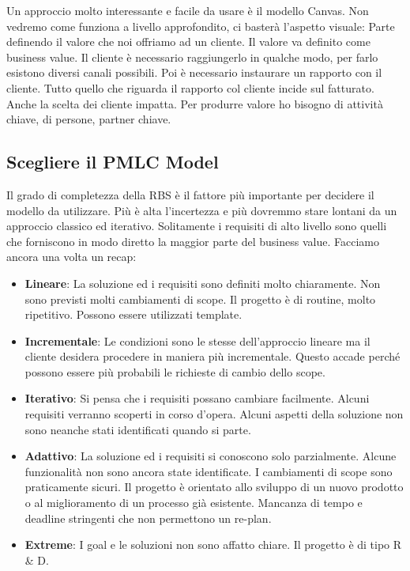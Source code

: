 \noindent Un approccio molto interessante e facile da usare è il modello Canvas. Non vedremo come funziona a livello approfondito, ci basterà l'aspetto visuale:
\noindent Parte definendo il valore che noi offriamo ad un cliente. Il valore va definito come business value. Il cliente è necessario raggiungerlo in qualche modo, per farlo esistono diversi canali possibili. Poi è necessario instaurare un rapporto con il cliente. Tutto quello che riguarda il rapporto col cliente incide sul fatturato. Anche la scelta dei cliente impatta. Per produrre valore ho bisogno di attività chiave, di persone, partner chiave.
\subsection{Scegliere il PMLC Model}
Il grado di completezza della RBS è il fattore più importante per decidere il modello da utilizzare. Più è alta l'incertezza e più dovremmo stare lontani da un approccio classico ed iterativo.\newline
Solitamente i requisiti di alto livello sono quelli che forniscono in modo diretto la maggior parte del business value. Facciamo ancora una volta un recap:
\begin{itemize}
	\item \textbf{Lineare}: La soluzione ed i requisiti sono definiti molto chiaramente. Non sono previsti molti cambiamenti di scope. Il progetto è di routine, molto ripetitivo. Possono essere utilizzati template.
	\item \textbf{Incrementale}: Le condizioni sono le stesse dell'approccio lineare ma il cliente desidera procedere in maniera più incrementale. Questo accade perché possono essere più probabili le richieste di cambio dello scope.
	\item \textbf{Iterativo}: Si pensa che i requisiti possano cambiare facilmente. Alcuni requisiti verranno scoperti in corso d'opera. Alcuni aspetti della soluzione non sono neanche stati identificati quando si parte.
	\item \textbf{Adattivo}: La soluzione ed i requisiti si conoscono solo parzialmente. Alcune funzionalità non sono ancora state identificate. I cambiamenti di scope sono praticamente sicuri.  Il progetto è orientato allo sviluppo di un nuovo prodotto o al miglioramento di un processo già esistente. Mancanza di tempo e deadline stringenti che non permettono un re-plan.
	\item \textbf{Extreme}: I goal e le soluzioni non sono affatto chiare. Il progetto è di tipo R \& D.
\end{itemize}
